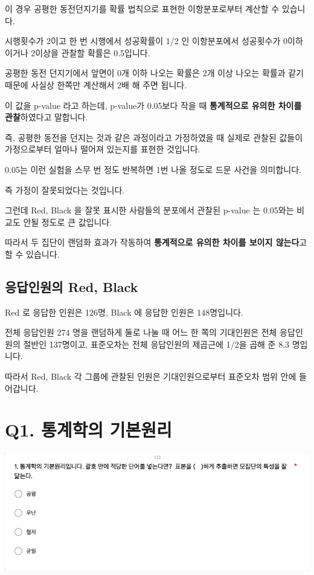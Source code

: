 \documentclass[
]{book}
\begin{document}
이 경우 공평한 동전던지기를 확률 법칙으로 표현한 이항분포로부터 계산할 수 있습니다.

시행횟수가 2이고 한 번 시행에서 성공확률이 1/2 인 이항분포에서 성공횟수가 0이하이거나 2이상을 관찰할 확률은 0.5입니다.

공평한 동전 던지기에서 앞면이 0개 이하 나오는 확률은 2개 이상 나오는 확률과 같기 때문에 사실상 한쪽만 계산해서 2배 해 주면 됩니다.

이 값을 p-value 라고 하는데, p-value가 0.05보다 작을 때 \textbf{통계적으로 유의한 차이를 관찰}하였다고 말합니다.

즉, 공평한 동전을 던지는 것과 같은 과정이라고 가정하였을 때 실제로 관찰된 값들이 가정으로부터 얼마나 떨어져 있는지를 표현한 것입니다.

0.05는 이런 실험을 스무 번 정도 반복하면 1번 나올 정도로 드문 사건을 의미합니다.

즉 가정이 잘못되었다는 것입니다.

그런데 Red, Black 을 잘못 표시한 사람들의 분포에서 관찰된 p-value 는 0.05와는 비교도 안될 정도로 큰 값입니다.

따라서 두 집단이 랜덤화 효과가 작동하여 \textbf{통계적으로 유의한 차이를 보이지 않는다}고 할 수 있습니다.

\subsection{응답인원의 Red, Black}\label{uxc751uxb2f5uxc778uxc6d0uxc758-red-black-6}

Red 로 응답한 인원은 126명, Black 에 응답한 인원은 148명입니다.

전체 응답인원 274 명을 랜덤하게 둘로 나눌 때 어느 한 쪽의 기대인원은 전체 응답인원의 절반인 137명이고, 표준오차는 전체 응답인원의 제곱근에 1/2을 곱해 준 8.3 명입니다.

따라서 Red, Black 각 그룹에 관찰된 인원은 기대인원으로부터 표준오차 범위 안에 들어갑니다.

\section{Q1. 통계학의 기본원리}\label{q1.-uxd1b5uxacc4uxd559uxc758-uxae30uxbcf8uxc6d0uxb9ac}

\begin{flushleft}\includegraphics[width=0.75\linewidth]{./pics/Quiz210406_Q1} \end{flushleft}
\end{document}
